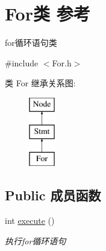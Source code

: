 \hypertarget{class_for}{}\section{For类 参考}
\label{class_for}


for循环语句类  




{\ttfamily \#include $<$For.\+h$>$}

类 For 继承关系图\+:\begin{figure}[H]
\begin{center}
\leavevmode
\includegraphics[height=3.000000cm]{class_for}
\end{center}
\end{figure}
\subsection*{Public 成员函数}
\begin{DoxyCompactItemize}
\item 
int \hyperlink{class_for_ad099d6d48c640dd5127285e59bbaba15}{execute} ()\hypertarget{class_for_ad099d6d48c640dd5127285e59bbaba15}{}\label{class_for_ad099d6d48c640dd5127285e59bbaba15}

\begin{DoxyCompactList}\small\item\em 执行for循环语句 \end{DoxyCompactList}\end{DoxyCompactItemize}
